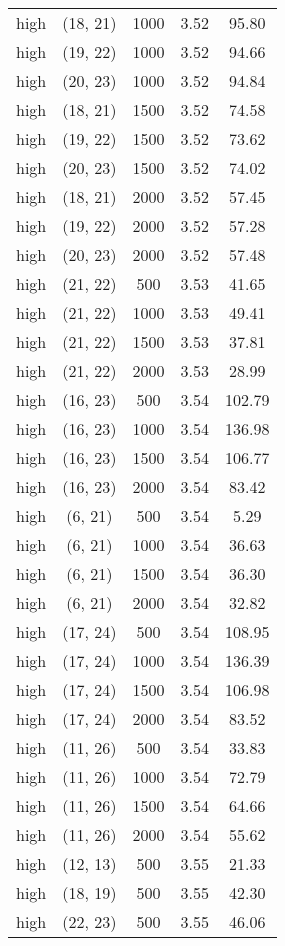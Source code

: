 \begin{tabular}{c c c c c}
high & (18, 21) &  1000 & 3.52 & 95.80 \\
high & (19, 22) &  1000 & 3.52 & 94.66 \\
high & (20, 23) &  1000 & 3.52 & 94.84 \\
high & (18, 21) &  1500 & 3.52 & 74.58 \\
high & (19, 22) &  1500 & 3.52 & 73.62 \\
high & (20, 23) &  1500 & 3.52 & 74.02 \\
high & (18, 21) &  2000 & 3.52 & 57.45 \\
high & (19, 22) &  2000 & 3.52 & 57.28 \\
high & (20, 23) &  2000 & 3.52 & 57.48 \\
high & (21, 22) &  500 & 3.53 & 41.65 \\
high & (21, 22) &  1000 & 3.53 & 49.41 \\
high & (21, 22) &  1500 & 3.53 & 37.81 \\
high & (21, 22) &  2000 & 3.53 & 28.99 \\
high & (16, 23) &  500 & 3.54 & 102.79 \\
high & (16, 23) &  1000 & 3.54 & 136.98 \\
high & (16, 23) &  1500 & 3.54 & 106.77 \\
high & (16, 23) &  2000 & 3.54 & 83.42 \\
high & (6, 21) &  500 & 3.54 & 5.29 \\
high & (6, 21) &  1000 & 3.54 & 36.63 \\
high & (6, 21) &  1500 & 3.54 & 36.30 \\
high & (6, 21) &  2000 & 3.54 & 32.82 \\
high & (17, 24) &  500 & 3.54 & 108.95 \\
high & (17, 24) &  1000 & 3.54 & 136.39 \\
high & (17, 24) &  1500 & 3.54 & 106.98 \\
high & (17, 24) &  2000 & 3.54 & 83.52 \\
high & (11, 26) &  500 & 3.54 & 33.83 \\
high & (11, 26) &  1000 & 3.54 & 72.79 \\
high & (11, 26) &  1500 & 3.54 & 64.66 \\
high & (11, 26) &  2000 & 3.54 & 55.62 \\
high & (12, 13) &  500 & 3.55 & 21.33 \\
high & (18, 19) &  500 & 3.55 & 42.30 \\
high & (22, 23) &  500 & 3.55 & 46.06 \\

\end{tabular}
